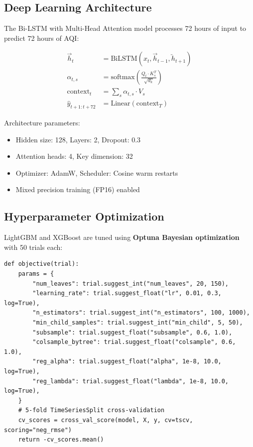 \documentclass[12pt, a4paper, oneside]{article}
\begin{document}
\subsection{Deep Learning Architecture}

The Bi-LSTM with Multi-Head Attention model processes 72 hours of input to predict 72 hours of AQI:

\begin{align}
\vec{h}_t &= \text{BiLSTM}(x_t, \vec{h}_{t-1}, \overleftarrow{h}_{t+1}) \\
\alpha_{t,s} &= \text{softmax}\left(\frac{Q_t \cdot K_s^T}{\sqrt{d_k}}\right) \\
\text{context}_t &= \sum_s \alpha_{t,s} \cdot V_s \\
\hat{y}_{t+1:t+72} &= \text{Linear}(\text{context}_T)
\end{align}

Architecture parameters:
\begin{itemize}
    \item Hidden size: 128, Layers: 2, Dropout: 0.3
    \item Attention heads: 4, Key dimension: 32
    \item Optimizer: AdamW, Scheduler: Cosine warm restarts
    \item Mixed precision training (FP16) enabled
\end{itemize}

\subsection{Hyperparameter Optimization}

LightGBM and XGBoost are tuned using \textbf{Optuna Bayesian optimization} with 50 trials each:

\begin{lstlisting}[caption={Optuna HPO for LightGBM}]
def objective(trial):
    params = {
        "num_leaves": trial.suggest_int("num_leaves", 20, 150),
        "learning_rate": trial.suggest_float("lr", 0.01, 0.3, log=True),
        "n_estimators": trial.suggest_int("n_estimators", 100, 1000),
        "min_child_samples": trial.suggest_int("min_child", 5, 50),
        "subsample": trial.suggest_float("subsample", 0.6, 1.0),
        "colsample_bytree": trial.suggest_float("colsample", 0.6, 1.0),
        "reg_alpha": trial.suggest_float("alpha", 1e-8, 10.0, log=True),
        "reg_lambda": trial.suggest_float("lambda", 1e-8, 10.0, log=True),
    }
    # 5-fold TimeSeriesSplit cross-validation
    cv_scores = cross_val_score(model, X, y, cv=tscv, scoring="neg_rmse")
    return -cv_scores.mean()
\end{lstlisting}
\end{document}
